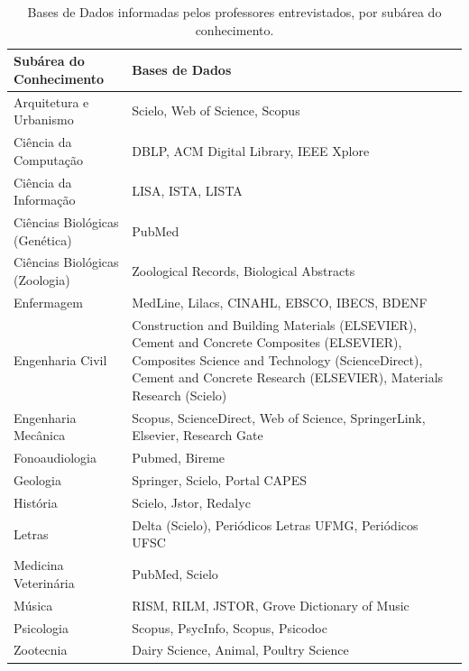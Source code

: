 \begin{table}[h!]
    \caption{Bases de Dados informadas pelos professores entrevistados, por subárea do conhecimento.}
    \begin{center}
        \begin{tabular}{|p{6cm}|p{8cm}|}
            \hline 
            \textbf{Subárea do Conhecimento} & \textbf{Bases de Dados} \\ 
            \hline 
            Arquitetura e Urbanismo & Scielo, Web of Science, Scopus \\
            \hline
            Ciência da Computação & DBLP, ACM Digital Library, IEEE Xplore \\
            \hline
            Ciência da Informação & LISA, ISTA, LISTA \\
            \hline
            Ciências Biológicas (Genética) & PubMed \\
            \hline
            Ciências Biológicas (Zoologia) & Zoological Records, Biological Abstracts \\
            \hline
            Enfermagem & MedLine, Lilacs, CINAHL, EBSCO, IBECS, BDENF \\
            \hline
            Engenharia Civil & Construction and Building Materials (ELSEVIER), Cement and Concrete Composites (ELSEVIER), Composites Science and Technology (ScienceDirect), Cement and Concrete Research (ELSEVIER), Materials Research (Scielo) \\
            \hline
            Engenharia Mecânica & Scopus, ScienceDirect, Web of Science, SpringerLink, Elsevier, Research Gate \\
            \hline
            Fonoaudiologia & Pubmed, Bireme \\
            \hline
            Geologia & Springer, Scielo, Portal CAPES \\
            \hline
            História & Scielo, Jstor, Redalyc \\
            \hline
            Letras & Delta (Scielo), Periódicos Letras UFMG, Periódicos UFSC \\
            \hline
            Medicina Veterinária & PubMed, Scielo \\
            \hline
            Música & RISM, RILM, JSTOR, Grove Dictionary of Music \\
            \hline
            Psicologia & Scopus, PsycInfo, Scopus, Psicodoc \\
            \hline
            Zootecnia & Dairy Science, Animal, Poultry Science \\
            \hline
        \end{tabular}
    \end{center}
    \label{tab:databases}
\end{table}

